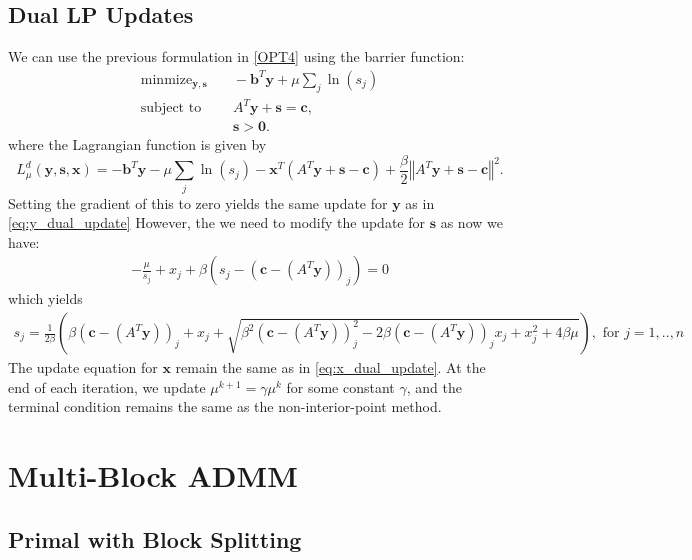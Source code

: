 \documentclass{article}
\begin{document}
\subsection*{Dual LP Updates}
We can use the previous formulation in \eqref{OPT4} using the barrier function:
\begin{align}
\text{minmize}_{\mathbf{y}, \mathbf{s}} &\quad -\mathbf{b}^T\mathbf{y} + \mu \sum_j \ln (s_j)  \tag{OPT6}\label{OPT6} \\
\text{subject to } &\quad  A^T \mathbf{y}  + \mathbf{s} = \mathbf{c},  \nonumber \\
&\quad \mathbf{s} > \mathbf{0} \nonumber.
\end{align}
where the Lagrangian function is given by
\[
L_{\mu}^{d}(\mathbf{y},\mathbf{s},\mathbf{x})=-\mathbf{b}^{T}\mathbf{y}-\mu\sum_{j}\ln\left(s_{j}\right)-\mathbf{x}^{T}\left(A^{T}\mathbf{y}+\mathbf{s}-\mathbf{c}\right)+\frac{\beta}{2}\left\Vert A^{T}\mathbf{y}+\mathbf{s}-\mathbf{c}\right\Vert ^{2}.
\]
Setting the gradient of this to zero yields the same update for $\mathbf{y}$ as in \eqref{eq:y_dual_update} 
However, the we need to modify the update for $\mathbf{s}$ as now we have:
\begin{align}
- \frac{\mu}{s_j} + x_j  + \beta \left(s_j - (\mathbf{c} - (A^T \mathbf{y}))_j\right)= 0
\end{align}
which yields 
\begin{align}
s_j = \frac{1}{2\beta}\left(\beta (\mathbf{c} - (A^T \mathbf{y}))_j + x_j  + \sqrt{\beta^2 (\mathbf{c} - (A^T \mathbf{y}))_j^2 - 2\beta (\mathbf{c} - (A^T \mathbf{y}))_j x_{j} + x_j^2 + 4\beta\mu } \right), \text{ for $j = 1,..,n$}
\end{align}
The update equation for $\mathbf{x}$ remain the same as in \eqref{eq:x_dual_update}. At the end of each iteration, we update $\mu^{k+1} = \gamma \mu^k$ for some constant $\gamma$, and the terminal condition remains the same as the non-interior-point method.




\vspace{0.5in}
{\color{red} \section*{Multi-Block ADMM}}

{\color{red} \subsection*{Primal with Block Splitting}}
\end{document}
